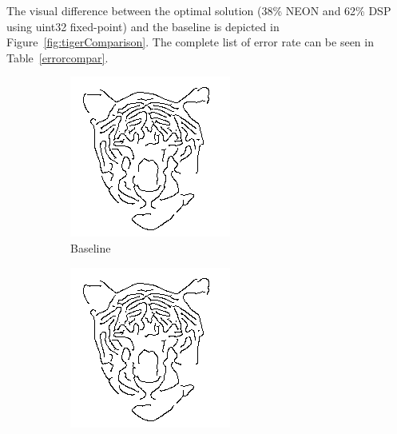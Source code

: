 \documentclass[conference]{IEEEtran}
\begin{document}
The visual difference between the optimal solution (38\% NEON and 62\% DSP using uint32 fixed-point) and the baseline is depicted in Figure~\ref{fig:tigerComparison}. The complete list of error rate can be seen in Table~\ref{errorcompar}.


\begin{figure}[!ht]
\centering
\begin{subfigure}[b]{0.2\textwidth}
    \includegraphics[width=\textwidth]{pic/tiger_baseline}
    \caption{Baseline}
    \label{fig:tigerBaseline}
\end{subfigure}
\begin{subfigure}[b]{0.2\textwidth}
    \includegraphics[width=\textwidth]{pic/tiger_38_u32_result}

\end{subfigure}
\end{figure}
\end{document}
